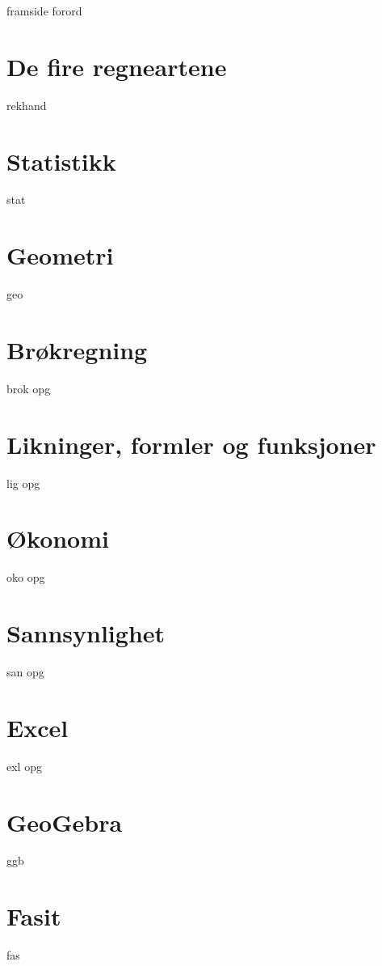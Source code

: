 




{framside}
{forord}

\tableofcontents
\chapter{De fire regneartene}
\newpage
{rekhand}

\chapter{Statistikk}
\newpage
{stat}

\chapter{Geometri}
{geo}

\chapter{Brøkregning \label{Br}}
\newpage
{brok}
\newpage
{opg}

\chapter{Likninger, formler og funksjoner \label{Lig}}
{lig}
{opg}


\chapter{Økonomi \label{Oko}}
{oko}
{opg}

\chapter{Sannsynlighet \label{San}} 
{san}
{opg}
\newpage

\chapter*{Excel} 
{exl}	
\newpage
{opg}	


\chapter*{GeoGebra} 
{ggb}	

\chapter*{Fasit}
{fas}






